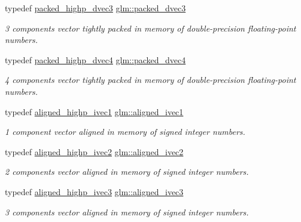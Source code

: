 \begin{DoxyCompactItemize}
typedef \mbox{\hyperlink{group__gtc__type__aligned_ga46950596525c0d1983113ead5f676651}{packed\+\_\+highp\+\_\+dvec3}} \mbox{\hyperlink{group__gtc__type__aligned_ga57dabe800889e40fa81a5a7a81cc25f0}{glm\+::packed\+\_\+dvec3}}
\begin{DoxyCompactList}\small\item\em 3 components vector tightly packed in memory of double-\/precision floating-\/point numbers. \end{DoxyCompactList}\item 
typedef \mbox{\hyperlink{group__gtc__type__aligned_ga7eb6a2440202876a3a223a1931dd496a}{packed\+\_\+highp\+\_\+dvec4}} \mbox{\hyperlink{group__gtc__type__aligned_ga858e69be626bfb48d644d8d6fe81b1a2}{glm\+::packed\+\_\+dvec4}}
\begin{DoxyCompactList}\small\item\em 4 components vector tightly packed in memory of double-\/precision floating-\/point numbers. \end{DoxyCompactList}\item 
typedef \mbox{\hyperlink{group__gtc__type__aligned_ga90ebad7148156f223d4743091c9870d5}{aligned\+\_\+highp\+\_\+ivec1}} \mbox{\hyperlink{group__gtc__type__aligned_gafe9657c41fa58e912f99e92284d79fce}{glm\+::aligned\+\_\+ivec1}}
\begin{DoxyCompactList}\small\item\em 1 component vector aligned in memory of signed integer numbers. \end{DoxyCompactList}\item 
typedef \mbox{\hyperlink{group__gtc__type__aligned_ga34105808a80ef5dabd7807997dfef328}{aligned\+\_\+highp\+\_\+ivec2}} \mbox{\hyperlink{group__gtc__type__aligned_ga2a709e1d21f3aae3f8d6de910f5fdff4}{glm\+::aligned\+\_\+ivec2}}
\begin{DoxyCompactList}\small\item\em 2 components vector aligned in memory of signed integer numbers. \end{DoxyCompactList}\item 
typedef \mbox{\hyperlink{group__gtc__type__aligned_gaa469d8bf0cb9ae640c943d847ec48f95}{aligned\+\_\+highp\+\_\+ivec3}} \mbox{\hyperlink{group__gtc__type__aligned_gabbf85e492d39baef3a418c15c996ab65}{glm\+::aligned\+\_\+ivec3}}
\begin{DoxyCompactList}\small\item\em 3 components vector aligned in memory of signed integer numbers. \end{DoxyCompactList}\item 

\end{DoxyCompactItemize}
